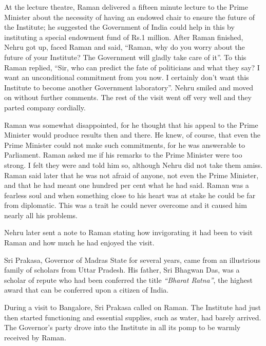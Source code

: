 At the lecture theatre, Raman delivered a fifteen minute lecture to the Prime Minister about the necessity of having an endowed chair to ensure the future of the Institute; he suggested the Government of India could help in this by instituting a special endowment fund of Rs.\@ 1 million. After Raman finished, Nehru got up, faced Raman and said, ``Raman, why do you worry about the future of your Institute? The Government will gladly take care of it''. To this Raman replied, ``Sir, who can predict the fate of politicians and what they say? I want an unconditional commitment from you now. I certainly don't want this Institute to become another Government laboratory''. Nehru smiled and moved on without further comments. The rest of the visit went off very well and they parted company cordially.

Raman was somewhat disappointed, for he thought that his appeal to the Prime Minister would produce results then and there. He knew, of course, that even the Prime Minister could not make such commitments, for he was answerable to Parliament. Raman asked me if his remarks to the Prime Minister were too strong. I felt they were and told him so, although Nehru did not take them amiss. Raman said later that he was not afraid of anyone, not even the Prime Minister, and that he had meant one hundred per cent what he had said. Raman was a fearless soul and when something close to his heart was at stake he could be far from diplomatic. This was a trait he could never overcome and it caused him nearly all his problems.


Nehru later sent a note to Raman stating how invigorating it had been to visit Raman and how much he had enjoyed the visit.

\bigskip
{}
\smallskip

\noindent
Sri Prakasa, Governor of Madras State for several years, came from an illustrious family of scholars from Uttar Pradesh. His father, Sri Bhagwan Das, was a scholar of repute who had been conferred the title {\em ``Bharat Ratna''}, the highest award that can be conferred upon a citizen of India.

\newpage

During a visit to Bangalore, Sri Prakasa called on Raman. The Institute had just then started functioning and essential supplies, such as water, had barely arrived. The Governor's party drove into the Institute in all its pomp to be warmly received by Raman.

